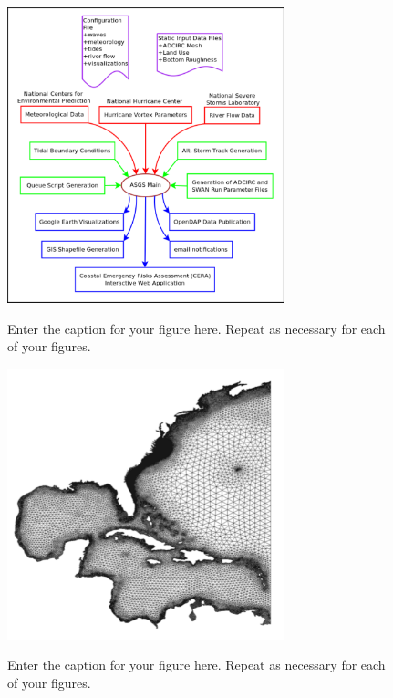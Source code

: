 \documentclass[12pt]{article}
\begin{document}
\begin{figure}[t]
  \noindent\includegraphics[width=19pc,angle=0]{asgs_structure_color.pdf}\\
  \caption{Enter the caption for your figure here.  Repeat as
  necessary for each of your figures.}\label{f2}
\end{figure}

\begin{figure}[t]
  \noindent\includegraphics[width=19pc,angle=0]{ncv6b_mesh.pdf}\\
  \caption{Enter the caption for your figure here.  Repeat as
  necessary for each of your figures.}\label{f3}
\end{figure}
\end{document}

